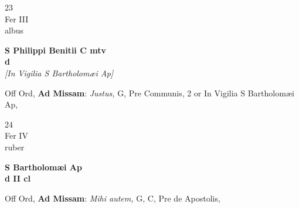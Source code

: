 \documentclass[10pt, openany]{book}
\begin{document}
        \begin{center}
            \begin{minipage}{3.5in}
                \vspace{2em}
                \begin{minipage}{0.5in}
                    {\Huge 23} \\
                    {\normalsize Fer III} \\
                    {\normalsize albus}
                \end{minipage}
                \begin{minipage}{3.0in}
                    \textbf{ \large S Philippi Benitii C mtv \\
                    \textnormal{\normalsize d}} \\ \textit{[In Vigilia S Bartholomæi Ap]} \\ 
                \end{minipage}
                \begin{justify}Off Ord, \textbf{Ad Missam}: \textit{Justus,} G, Pre Communis, 2 or In Vigilia S Bartholomæi Ap,   
                \end{justify}
            \end{minipage}
        \end{center}
    
        \begin{center}
            \begin{minipage}{3.5in}
                \vspace{2em}
                \begin{minipage}{0.5in}
                    {\Huge 24} \\
                    {\normalsize Fer IV} \\
                    {\normalsize ruber}
                \end{minipage}
                \begin{minipage}{3.0in}
                    \textbf{ \large S Bartholomæi Ap \\
                    \textnormal{\normalsize d II cl}} \\ 
                \end{minipage}
                \begin{justify}Off Ord, \textbf{Ad Missam}: \textit{Mihi autem,} G, C, Pre de Apostolis,   
                \end{justify}
            \end{minipage}
        \end{center}
    
\end{document}
